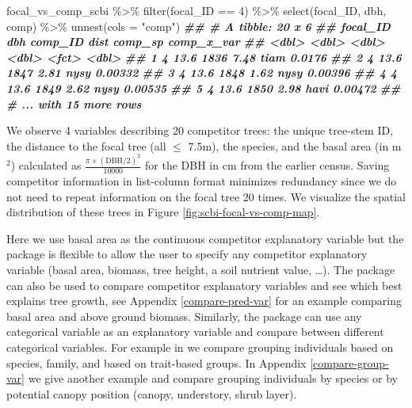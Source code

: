 \documentclass[12pt]{article}
\newenvironment{Shaded}{\begin{snugshade}}{\end{snugshade}}
\newcommand{\AttributeTok}[1]{\textcolor[rgb]{0.77,0.63,0.00}{#1}}
\newcommand{\DecValTok}[1]{\textcolor[rgb]{0.00,0.00,0.81}{#1}}
\newcommand{\DocumentationTok}[1]{\textcolor[rgb]{0.56,0.35,0.01}{\textbf{\textit{#1}}}}
\newcommand{\FunctionTok}[1]{\textcolor[rgb]{0.00,0.00,0.00}{#1}}
\newcommand{\NormalTok}[1]{#1}
\newcommand{\SpecialCharTok}[1]{\textcolor[rgb]{0.00,0.00,0.00}{#1}}
\newcommand{\StringTok}[1]{\textcolor[rgb]{0.31,0.60,0.02}{#1}}
\begin{document}
\begin{Shaded}
\begin{Highlighting}[]
\NormalTok{focal\_vs\_comp\_scbi }\SpecialCharTok{\%\textgreater{}\%}
    \FunctionTok{filter}\NormalTok{(focal\_ID }\SpecialCharTok{==} \DecValTok{4}\NormalTok{) }\SpecialCharTok{\%\textgreater{}\%}
    \FunctionTok{select}\NormalTok{(focal\_ID, dbh, comp) }\SpecialCharTok{\%\textgreater{}\%}
    \FunctionTok{unnest}\NormalTok{(}\AttributeTok{cols =} \StringTok{"comp"}\NormalTok{)}
\DocumentationTok{\#\# \# A tibble: 20 x 6}
\DocumentationTok{\#\#   focal\_ID   dbh comp\_ID  dist comp\_sp comp\_x\_var}
\DocumentationTok{\#\#      \textless{}dbl\textgreater{} \textless{}dbl\textgreater{}   \textless{}dbl\textgreater{} \textless{}dbl\textgreater{} \textless{}fct\textgreater{}        \textless{}dbl\textgreater{}}
\DocumentationTok{\#\# 1        4  13.6    1836  7.48 tiam       0.0176 }
\DocumentationTok{\#\# 2        4  13.6    1847  2.81 nysy       0.00332}
\DocumentationTok{\#\# 3        4  13.6    1848  1.62 nysy       0.00396}
\DocumentationTok{\#\# 4        4  13.6    1849  2.62 nysy       0.00535}
\DocumentationTok{\#\# 5        4  13.6    1850  2.98 havi       0.00472}
\DocumentationTok{\#\# \# ... with 15 more rows}
\end{Highlighting}
\end{Shaded}

We observe 4 variables describing 20 competitor trees: the unique
tree-stem ID, the distance to the focal tree (all \(\leq\) 7.5m), the
species, and the basal area (in m\(^2\)) calculated as
\(\frac{\pi \times (\text{DBH/2})^2}{10000}\) for the DBH in cm from the
earlier census. Saving competitor information in list-column format
minimizes redundancy since we do not need to repeat information on the
focal tree 20 times. We visualize the spatial distribution of these
trees in Figure \ref{fig:scbi-focal-vs-comp-map}.

Here we use basal area as the continuous competitor explanatory variable
but the package is flexible to allow the user to specify any competitor
explanatory variable (basal area, biomass, tree height, a soil nutrient
value, \dots). The package can also be used to compare competitor
explanatory variables and see which best explains tree growth, see
Appendix \ref{compare-pred-var} for an example comparing basal area and
above ground biomass. Similarly, the package can use any categorical
variable as an explanatory variable and compare between different
categorical variables. For example in \citet{allen_permutation_2020} we
compare grouping individuals based on species, family, and based on
trait-based groups. In Appendix \ref{compare-group-var} we give another
example and compare grouping individuals by species or by potential
canopy position (canopy, understory, shrub layer).
\end{document}
